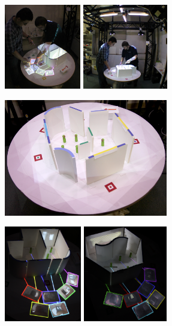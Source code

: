 \documentclass[landscape,final,a0paper,fontscale=0.285]{baposter}
\begin{document}
\begin{poster}
{  %
  {\includegraphics[height=10em]{img/ian_matt_pointing.jpg}}
  {\includegraphics[height=10em]{img/ian_matt_contraption_frame.jpg}}

  {\includegraphics[height=13.8em]{img/table_top_with_people_tokens.jpg}}


  {\includegraphics[height=11.25em]{img/office_color.jpg}} 
  {\includegraphics[height=11.25em]{img/museum_false_color2.jpg}}

}
\end{poster}
\end{document}
